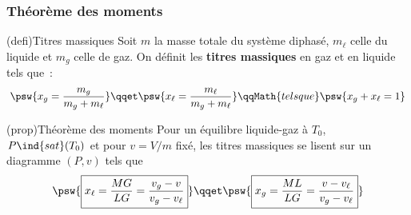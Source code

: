 \documentclass[../../main/main.tex]{subfiles}
\begin{document}
\subsubsection{Théorème des moments}

\begin{tcb*}(defi){Titres massiques}
	Soit $m$ la masse totale du système diphasé, $m_{\ell}$ celle du liquide et
	$m_g$ celle de gaz. On définit les \textbf{titres massiques} en gaz et en
	liquide tels que~:
	\[
		\psw{x_g = \frac{m_g}{m_g+m_{\ell}}}
		\qqet
		\psw{x_{\ell} = \frac{m_{\ell}}{m_g+m_{\ell}}}
		\qqMath{tels que}
		\psw{x_g + x_{\ell} = 1}
	\]
\end{tcb*}

\begin{tcb*}[sidebyside, lefthand ratio=.6](prop){Théorème des moments}
	Pour un équilibre liquide-gaz à $T_0$, $P\ind{sat}(T_0)$ et pour $v = V/m$
	fixé, les titres massiques se lisent sur un diagramme $(P,v)$ tels que
	\[
		\psw{\boxed{x_{\ell} = \frac{MG}{LG} = \frac{v_g - v}{v_g-v_{\ell}}}}
		\qqet
		\psw{\boxed{x_g = \frac{ML}{LG} = \frac{v - v_{\ell}}{v_g-v_{\ell}}}}
	\]
	\tcblower
	\begin{center}
		\vspace{-15pt}
	\end{center}
\end{tcb*}
\end{document}
